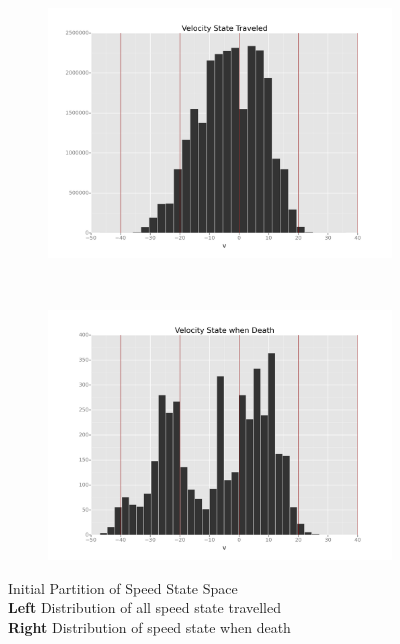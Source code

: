\documentclass[11pt]{article}
\theoremstyle{definition}
\begin{document}
\begin{figure}[!h]
        \centering
        \begin{subfigure}[b]{0.5\textwidth}
                \includegraphics[width=\textwidth]{"./plots/v_hist0"}
        \end{subfigure}%
~
        \begin{subfigure}[b]{0.5\textwidth}
                \includegraphics[width=\textwidth]{"./plots/v_death_hist0"}
        \end{subfigure}
  \caption{Initial Partition of Speed State Space\\ \textbf{Left} Distribution of all speed state travelled \\
  \textbf{Right} Distribution of speed state when death}
  \label{fig:part_initial2}
\end{figure}
\end{document}
